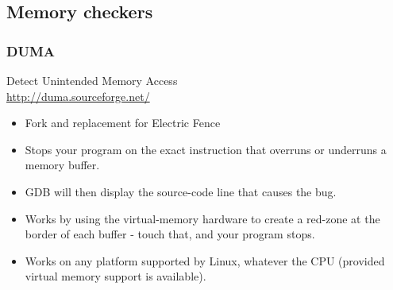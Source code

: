 \subsection{Memory checkers}

\begin{frame}
  \frametitle{DUMA}
  Detect Unintended Memory Access\\
  \url{http://duma.sourceforge.net/}
  \begin{itemize}
  \item Fork and replacement for Electric Fence
  \item Stops your program on the exact instruction that overruns or
    underruns a  memory buffer.
  \item GDB will then display the source-code line that causes the
    bug.
  \item Works by using the virtual-memory hardware to create a
    red-zone at the border of each buffer - touch that, and your
    program stops.
  \item Works on any platform supported by Linux, whatever the CPU
    (provided virtual memory support is available).
  \end{itemize}
\end{frame}

